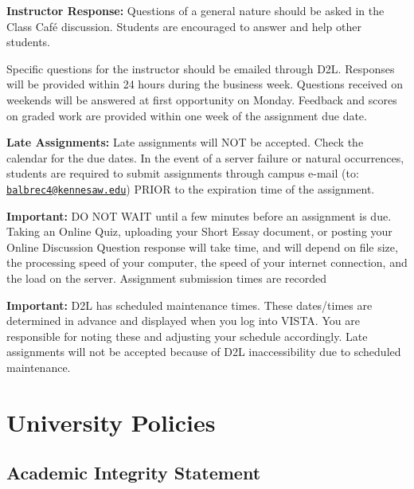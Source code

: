 \documentclass[11pt,]{article}
\begin{document}
\textbf{Instructor Response:} Questions of a general nature should be asked in the Class Café discussion.
Students are encouraged to answer and help other students.

Specific questions for the instructor should be emailed through D2L. Responses will be provided within 24 hours during
the business week. Questions received on weekends will be answered at first opportunity on Monday. Feedback and
scores on graded work are provided within one week of the assignment due date.

\textbf{Late Assignments:} Late assignments will NOT be accepted. Check the calendar for the due dates. In the event of a
server failure or natural occurrences, students are required to submit assignments through campus e-mail (to:
\href{mailto:balbrec4@kennesaw.edu}{\nolinkurl{balbrec4@kennesaw.edu}}) PRIOR to the expiration time of the assignment.

\textbf{Important:} DO NOT WAIT until a few minutes before an assignment is due. Taking an Online Quiz, uploading your Short
Essay document, or posting your Online Discussion Question response will take time, and will depend on file size, the
processing speed of your computer, the speed of your internet connection, and the load on the server. Assignment
submission times are recorded

\textbf{Important:} D2L has scheduled maintenance times. These dates/times are determined in advance and displayed when
you log into VISTA. You are responsible for noting these and adjusting your schedule accordingly. Late assignments will
not be accepted because of D2L inaccessibility due to scheduled maintenance.

\hypertarget{university-policies}{%
\section{University Policies}\label{university-policies}}

\hypertarget{academic-integrity-statement}{%
\subsection{Academic Integrity Statement}\label{academic-integrity-statement}}
\end{document}
